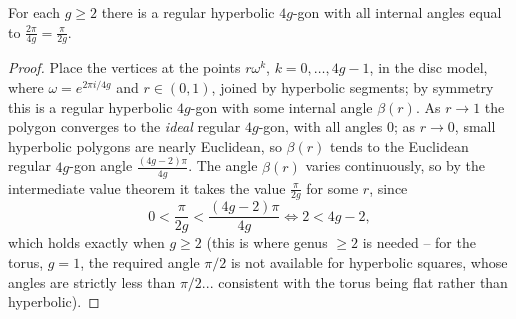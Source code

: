 \begin{lemma}\label{lem:4ggon}
    For each $g \geq 2$ there is a regular hyperbolic $4g$-gon with all internal angles equal to $\frac{2\pi}{4g} = \frac{\pi}{2g}$.
\end{lemma}
\begin{proof}
    Place the vertices at the points $r \omega^k$, $k = 0, \dots, 4g - 1$, in the disc model, where $\omega = e^{2\pi i/4g}$ and $r \in (0, 1)$, joined by hyperbolic segments; by symmetry this is a regular hyperbolic $4g$-gon with some internal angle $\beta(r)$. As $r \rightarrow 1$ the polygon converges to the \emph{ideal} regular $4g$-gon, with all angles $0$; as $r \rightarrow 0$, small hyperbolic polygons are nearly Euclidean, so $\beta(r)$ tends to the Euclidean regular $4g$-gon angle $\frac{(4g - 2)\pi}{4g}$. The angle $\beta(r)$ varies continuously, so by the intermediate value theorem it takes the value $\frac{\pi}{2g}$ for some $r$, since
    $$
    0 < \frac{\pi}{2g} < \frac{(4g-2)\pi}{4g} \iff 2 < 4g - 2,
    $$
    which holds exactly when $g \geq 2$ (this is where genus $\geq 2$ is needed -- for the torus, $g = 1$, the required angle $\pi/2$ is not available for hyperbolic squares, whose angles are strictly less than $\pi/2$... consistent with the torus being flat rather than hyperbolic).
\end{proof}

